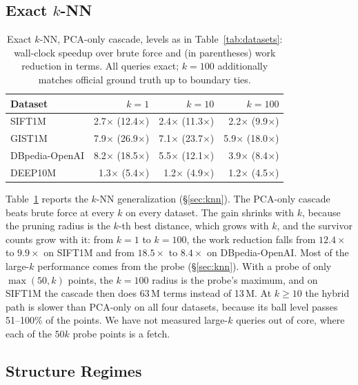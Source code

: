 \documentclass[sigconf, nonacm]{acmart}
\begin{document}
\subsection{Exact $k$-NN}
\label{sec:knn-eval}

\begin{table}[t]
\caption{Exact $k$-NN, PCA-only cascade, levels as in
Table~\ref{tab:datasets}: wall-clock speedup over brute force and (in
parentheses) work reduction in terms. All queries exact; $k{=}100$
additionally matches official ground truth up to boundary ties.}
\label{tab:knn}
\small
\begin{tabular}{@{}lrrr@{}}
\toprule
Dataset & $k=1$ & $k=10$ & $k=100$ \\
\midrule
SIFT1M & 2.7$\times$ (12.4$\times$) & 2.4$\times$ (11.3$\times$) & 2.2$\times$ (9.9$\times$) \\
GIST1M & 7.9$\times$ (26.9$\times$) & 7.1$\times$ (23.7$\times$) & 5.9$\times$ (18.0$\times$) \\
DBpedia-OpenAI & 8.2$\times$ (18.5$\times$) & 5.5$\times$ (12.1$\times$) & 3.9$\times$ (8.4$\times$) \\
DEEP10M & 1.3$\times$ (5.4$\times$) & 1.2$\times$ (4.9$\times$) & 1.2$\times$ (4.5$\times$) \\
\bottomrule
\end{tabular}
\end{table}

Table~\ref{tab:knn} reports the $k$-NN generalization (\S\ref{sec:knn}).
The PCA-only cascade beats brute force at every $k$ on every dataset. The
gain shrinks with $k$, because the pruning radius is the $k$-th best
distance, which grows with $k$, and the survivor counts grow with it: from
$k=1$ to $k=100$, the work reduction falls from $12.4\times$ to
$9.9\times$ on SIFT1M and from $18.5\times$ to $8.4\times$ on
DBpedia-OpenAI. Most of the large-$k$ performance comes from the probe
(\S\ref{sec:knn}). With a probe of only $\max(50,k)$ points, the
$k{=}100$ radius is the probe's maximum, and on SIFT1M the cascade then
does 63\,M terms instead of 13\,M. At $k \ge 10$ the hybrid path is
slower than PCA-only on all four datasets, because its ball level passes
51--100\% of the points. We have not measured large-$k$
queries out of core, where each of the $50k$ probe points is a fetch.

\subsection{Structure Regimes}
\label{sec:regimes}
\end{document}
